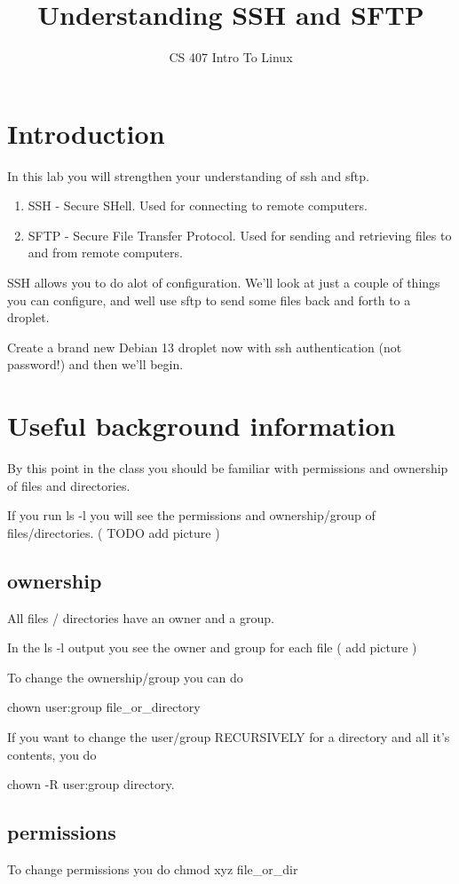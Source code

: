 \documentclass[12pt]{article}
\title{Understanding SSH and SFTP}
\author{CS 407 Intro To Linux}
\begin{document}
\maketitle

\section{Introduction}
In this lab you will strengthen your understanding of ssh and sftp.
\begin{enumerate}
    \item SSH - Secure SHell. Used for connecting to remote computers.
    \item SFTP - Secure File Transfer Protocol. Used for sending and retrieving files to and from remote computers.
\end{enumerate}

SSH allows you to do alot of configuration. We'll look at just a couple of things you can configure, and well use sftp to send some files back and forth to a droplet.

Create a brand new Debian 13 droplet now with ssh authentication (not password!) and then we'll begin.

\section{Useful background information}
By this point in the class you should be familiar with permissions and ownership of files and directories.

If you run ls -l you will see the permissions and ownership/group of files/directories. ( TODO add picture )

\subsection{ownership}
All files / directories have an owner and a group.

In the ls -l output you see the owner and group for each file ( add picture )

To change the ownership/group you can do 

chown user:group file\_or\_directory

If you want to change the user/group RECURSIVELY for a directory and all it's contents, you do 

chown -R user:group directory.

\subsection{permissions}
To change permissions you do 
chmod xyz file\_or\_dir
\end{document}
